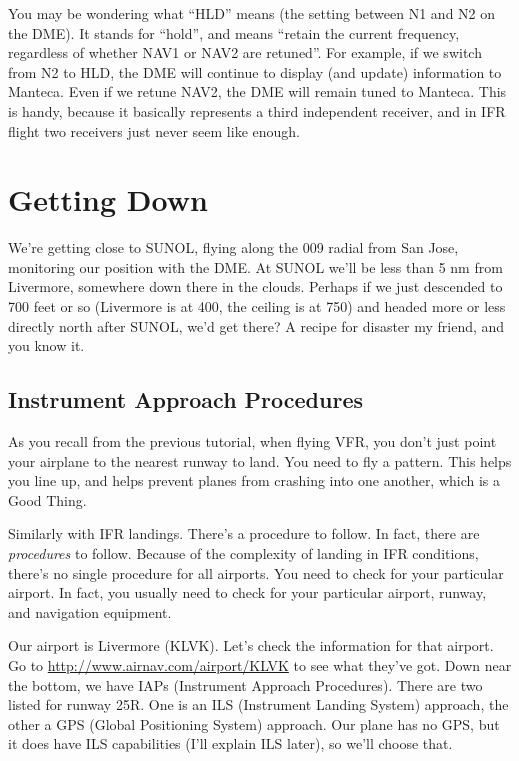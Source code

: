 
You may be wondering what ``HLD'' means (the setting between N1 and N2
on the DME).  It stands for ``hold'', and means ``retain the current
frequency, regardless of whether NAV1 or NAV2 are retuned''.  For
example, if we switch from N2 to HLD, the DME will continue to display
(and update) information to Manteca.  Even if we retune NAV2, the DME
will remain tuned to Manteca.  This is handy, because it basically
represents a third independent receiver, and in IFR flight two
receivers just never seem like enough.


\section{Getting Down}

We're getting close to SUNOL, flying along the 009 radial from San
Jose, monitoring our position with the DME.  At SUNOL we'll be less
than 5 nm from Livermore, somewhere down there in the clouds.  Perhaps
if we just descended to 700 feet or so (Livermore is at 400, the
ceiling is at 750) and headed more or less directly north after SUNOL,
we'd get there?  A recipe for disaster my friend, and you know it.

\subsection{Instrument Approach Procedures}

As you recall from the previous tutorial, when flying VFR, you don't
just point your airplane to the nearest runway to land.  You need to
fly a pattern.  This helps you line up, and helps prevent planes from
crashing into one another, which is a Good Thing.

Similarly with IFR landings.  There's a procedure to follow.  In fact,
there are \emph{procedures} to follow.  Because of the complexity of
landing in IFR conditions, there's no single procedure for all
airports.  You need to check for your particular airport.  In fact,
you usually need to check for your particular airport, runway, and
navigation equipment.

Our airport is Livermore (KLVK).  Let's check the information for that
airport.  Go to \url{http://www.airnav.com/airport/KLVK} to see what
they've got.  Down near the bottom, we have IAPs (Instrument Approach
Procedures).  There are two listed for runway 25R.  One is an ILS
(Instrument Landing System) approach, the other a GPS (Global
Positioning System) approach.  Our plane has no GPS, but it does have
ILS capabilities (I'll explain ILS later), so we'll choose that.

